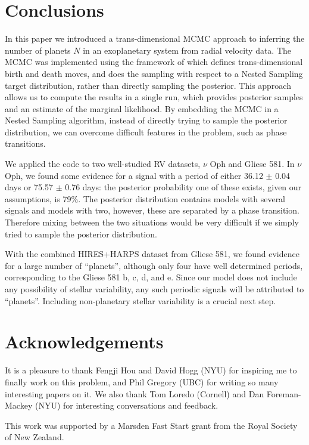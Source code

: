 \documentclass[useAMS,usenatbib]{mn2e}
\begin{document}
\section{Conclusions}
In this paper we introduced a trans-dimensional MCMC approach to inferring
the number of planets $N$ in an exoplanetary system from radial velocity data.
The MCMC was implemented using the framework of \citet{rjobject} which
defines trans-dimensional birth and death moves, and does the sampling
with respect to a Nested Sampling target distribution, rather than directly
sampling the posterior. This approach allows us to compute the results in a
single run, which provides posterior samples and an estimate of the marginal
likelihood. By embedding the MCMC in a Nested Sampling algorithm, instead of
directly trying to sample the posterior distribution, we can overcome difficult
features in the problem, such as phase transitions.

We applied the code to two well-studied RV datasets, $\nu$ Oph and Gliese 581.
In $\nu$ Oph, we found some evidence for a signal with a period of
either 36.12 $\pm$ 0.04 days or
75.57 $\pm$ 0.76 days: the posterior probability one of these exists, given our
assumptions, is 79\%. The posterior distribution contains models with several
signals and models with two, however, these are separated by a phase transition.
Therefore mixing between the two situations would be very difficult if we simply tried to sample the posterior distribution.

With the combined HIRES+HARPS dataset from Gliese 581, we found
evidence for a large number of ``planets'', although only four have well
determined periods, corresponding to the Gliese 581 b, c, d,
and e. Since our model does not include any possibility of stellar variability,
any such periodic signals will be attributed to ``planets''.
Including non-planetary stellar variability is a crucial next step.

\vspace{-0.5cm}
\section*{Acknowledgements}
It is a pleasure to thank Fengji Hou and David Hogg (NYU) for inspiring me to
finally work on this problem, and Phil Gregory (UBC) for writing so many
interesting papers on it. We also thank Tom Loredo (Cornell) and Dan
Foreman-Mackey (NYU) for interesting conversations and feedback.

This work was supported by a Marsden Fast Start
grant from the Royal Society of
New Zealand.
\end{document}
